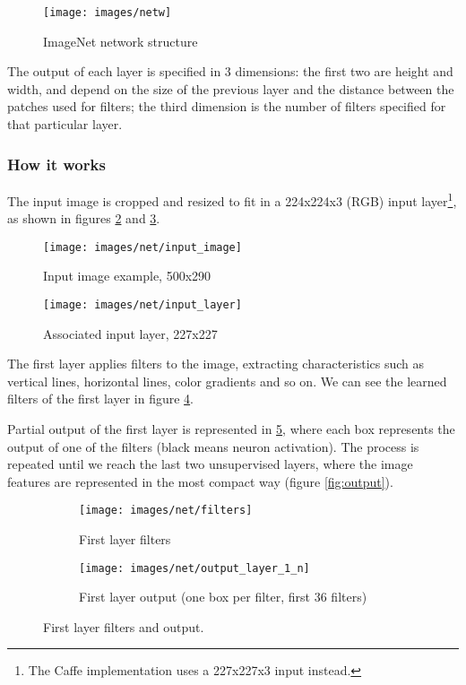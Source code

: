 \begin{figure}[hbtp]\centering
\texttt{[image: images/netw]}
\caption{ImageNet network structure}
\label{fig:net1}
\end{figure}

The output of each layer is specified in 3 dimensions: the first two are height
and width, and depend on the size of the previous layer and the distance between
the patches used for filters; the third dimension is the number of filters
specified for that particular layer.

\subsubsection{How it works}

The input image is cropped and resized to fit in a 224x224x3 (RGB) input
layer\footnote{The Caffe implementation uses a 227x227x3 input instead.}, as
shown in figures \ref{fig:input1} and \ref{fig:input2}.

\begin{figure}[h!]\centering
    \texttt{[image: images/net/input\_image]}
    \caption{Input image example, 500x290}
    \label{fig:input1}
\end{figure}

\begin{figure}[h!]\centering
    \texttt{[image: images/net/input\_layer]}
    \caption{Associated input layer, 227x227}
    \label{fig:input2}
\end{figure}

The first layer applies filters to the image, extracting characteristics such as
vertical lines, horizontal lines, color gradients and so on. We can see the
learned filters of the first layer in figure \ref{fig:filters1}. 

Partial output of the first layer is represented in \ref{fig:filters2}, where
each box represents the output of one of the filters (black means neuron
activation). The process is repeated until we reach the last two unsupervised
layers, where the image features are represented in the most compact way (figure
\ref{fig:output}).

\begin{figure*}[hbtp]\centering
\centering
\begin{subfigure}[t]{.4\textwidth}
    \centering
    \texttt{[image: images/net/filters]}
    \caption{First layer filters}
    \label{fig:filters1}
\end{subfigure}%
\begin{subfigure}[t]{.4\textwidth}
    \centering
    \texttt{[image: images/net/output\_layer\_1\_n]}
    \caption{First layer output (one box per filter, first 36 filters)}
    \label{fig:filters2}
\end{subfigure}
\caption{First layer filters and output.}
\label{fig:filters3}
\end{figure*}

